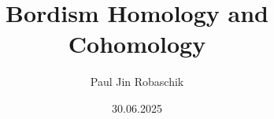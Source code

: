 \usepackage{amsmath, amssymb, amsthm, amsfonts, mathtools}
\usepackage[utf8]{inputenc}
\usepackage{comment}
\usepackage{hyperref}
\usepackage{geometry}
\usepackage[english]{babel}
\usepackage{csquotes}
\usepackage[backend=biber, style=alphabetic, sorting=nty]{biblatex}
\usepackage{BA_Titelseite}
\usepackage{graphicx}
\usepackage{quiver}
\usepackage{xcolor}





\graphicspath{ {./images/} }

\author{Paul Jin Robaschik}
\date{30.06.2025}

\title{Bordism Homology and Cohomology}

\theoremstyle{definition}
\newtheorem{definition}{Definition}[section]
\newtheorem{example}{Example}
\newtheorem{exs}[example]{Examples}
\newtheorem{nonex}[example]{Non-example}
\newtheorem{nonexs}[example]{Non-examples}

\theoremstyle{plain}
\newtheorem{theorem}[definition]{Theorem}
\newtheorem{proposition}[definition]{Proposition}
\newtheorem{lemma}[definition]{Lemma}
\newtheorem{corollary}[definition]{Corollary}
\newtheorem*{fact}{Fact}
\newtheorem*{observation}{Observation}

\theoremstyle{remark}
\newtheorem*{remark}{Remark}





\newcommand{\demph}[1]{{{{\textbf{#1}}}}}
\newcommand{\restrict}[1]{_{|_{#1}}}
\newcommand{\sus}{\Sigma}
\def\R{\mathbb{R}}
\newcommand{\dis}{\sqcup}
\newcommand{\Z}{\mathbb{Z}}
\newcommand{\pt}{\mathrm{pt}}
\newcommand{\C}{\mathbb{C}}
\newcommand{\N}{\mathfrak{N}}
\newcommand{\Q}{\mathbb{Q}}
\newcommand{\F}{\mathbb{F}}
\newcommand{\K}{\mathbb{K}}
\newcommand{\id}{\mathrm{id}}
\def\H{\mathbb{H}}
\def\h{\mathfrak{H}}
\newcommand{\im}{\mathrm{im}}
\newcommand{\T}{\mathbb{T}}

\newcommand{\todo}[1]{\textcolor{red}{#1}}
\newcommand{\unsure}[1]{\textcolor{blue}{#1}}